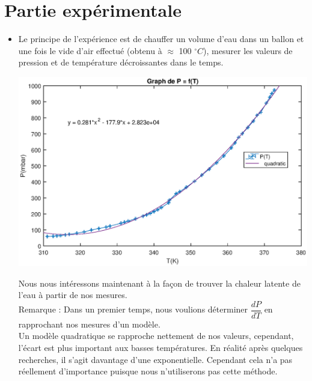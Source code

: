 \documentclass[12pt,a4paper]{article}
\begin{document}
\section{Partie expérimentale}
\begin{itemize}
\item Le principe de l'expérience est de chauffer un volume d'eau dans un ballon et une fois le vide d'air effectué (obtenu à $\approx$ 100 $ ^\circ C$), mesurer les valeurs de pression et de température décroissantes dans le temps.\\
\begin{bigcenter}
\includegraphics[scale=0.8]{PfT}
\end{bigcenter}
Nous nous intéressons maintenant à la  façon de trouver la chaleur latente de l'eau à partir de nos mesures. \\
Remarque : Dans un premier temps, nous voulions déterminer $\dfrac{dP}{dT}$ en rapprochant nos mesures d'un modèle.\\ Un modèle quadratique se rapproche nettement de nos valeurs, cependant, l'écart est plus important aux basses températures. En réalité après quelques recherches, il s'agit davantage d'une exponentielle. Cependant cela n'a pas réellement d'importance puisque nous n'utiliserons pas cette méthode.


\end{itemize}
\end{document}
